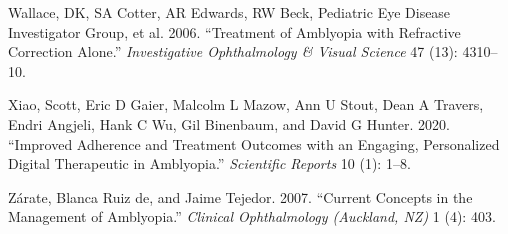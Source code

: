 \documentclass[
  letterpaper,
  DIV=11,
  numbers=noendperiod]{scrreprt}
\newlength{\cslhangindent}
\newlength{\cslentryspacingunit} %
\newenvironment{CSLReferences}[2] %
 {%
  \setlength{\parindent}{0pt}
  \ifodd #1
  \let\oldpar\par
  \def\par{\hangindent=\cslhangindent\oldpar}
  \fi
  \setlength{\parskip}{#2\cslentryspacingunit}
 }%
 {}
\begin{document}
\begin{CSLReferences}{1}{0}
\leavevmode{}%
Wallace, DK, SA Cotter, AR Edwards, RW Beck, Pediatric Eye Disease
Investigator Group, et al. 2006. {``Treatment of Amblyopia with
Refractive Correction Alone.''} \emph{Investigative Ophthalmology \&
Visual Science} 47 (13): 4310--10.

\leavevmode{}%
Xiao, Scott, Eric D Gaier, Malcolm L Mazow, Ann U Stout, Dean A Travers,
Endri Angjeli, Hank C Wu, Gil Binenbaum, and David G Hunter. 2020.
{``Improved Adherence and Treatment Outcomes with an Engaging,
Personalized Digital Therapeutic in Amblyopia.''} \emph{Scientific
Reports} 10 (1): 1--8.

\leavevmode{}%
Zárate, Blanca Ruiz de, and Jaime Tejedor. 2007. {``Current Concepts in
the Management of Amblyopia.''} \emph{Clinical Ophthalmology (Auckland,
NZ)} 1 (4): 403.

\end{CSLReferences}
\end{document}
